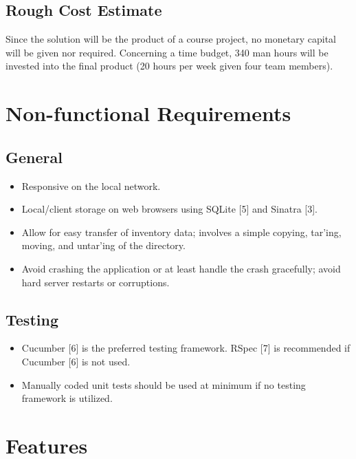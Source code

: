 \documentclass{article}
\begin{document}
\subsection{Rough Cost Estimate}
Since the solution will be the product of a course project, no monetary capital will be given nor required.  Concerning a time budget, 340 man hours will be invested into the final product (20 hours per week given four team members).

\section{Non-functional Requirements}

\subsection{General}
\begin{itemize}
\item Responsive on the local network.
\item Local/client storage on web browsers using SQLite [5] and Sinatra [3].
\item Allow for easy transfer of inventory data; involves a simple copying, tar'ing, moving, and untar'ing of the directory.
\item Avoid crashing the application or at least handle the crash gracefully; avoid hard server restarts or corruptions.
\end{itemize}

\subsection{Testing}
\begin{itemize}
\item Cucumber [6] is the preferred testing framework. RSpec [7] is recommended if Cucumber [6] is not used.
\item Manually coded unit tests should be used at minimum if no testing framework is utilized.
\end{itemize}

\section{Features}
\end{document}
